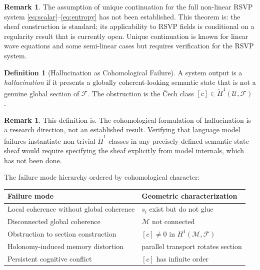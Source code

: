 \documentclass[12pt, a4paper]{article}
\theoremstyle{rsvpstyle}
\theoremstyle{definition}
\newtheorem{definition}[theorem]{Definition}
\newtheorem{remark}[theorem]{Remark}
\newcommand{\OpMan}{\mathcal{M}}
\begin{document}
\begin{remark}
The assumption of unique continuation for the full non-linear RSVP system
\eqref{eq:scalar}--\eqref{eq:entropy} has not been established. This theorem
is: the sheaf construction is standard; its applicability to RSVP
fields is conditional on a regularity result that is currently open.
Unique continuation is known for linear wave equations and some semi-linear
cases \citep{Tao2016} but requires verification for the RSVP system.
\end{remark}

\begin{definition}[Hallucination as Cohomological Failure]
A system output is a \emph{hallucination} if it presents a globally
coherent-looking semantic state that is not a genuine global section of
$\mathcal{F}$. The obstruction is the \v{C}ech class
$[c] \in \check{H}^1(\mathcal{U}, \mathcal{F})$ \citep{Hatcher2002}.
\end{definition}

\begin{remark}
This definition is. The cohomological formulation of hallucination
is a research direction, not an established result. Verifying that language
model failures instantiate non-trivial $\check{H}^1$ classes in any precisely
defined semantic state sheaf would require specifying the sheaf explicitly
from model internals, which has not been done.
\end{remark}

The failure mode hierarchy ordered by cohomological character:

\begin{center}
\begin{tabular}{ll}
\toprule
\textbf{Failure mode} & \textbf{Geometric characterization} \\
\midrule
Local coherence without global coherence & $s_i$ exist but do not glue \\
Disconnected global coherence & $\OpMan$ not connected \\
Obstruction to section construction & $[c] \neq 0$ in $H^1(\OpMan,\mathcal{F})$ \\
Holonomy-induced memory distortion & parallel transport rotates section \\
Persistent cognitive conflict & $[c]$ has infinite order \\
\bottomrule
\end{tabular}
\end{center}

\end{document}
